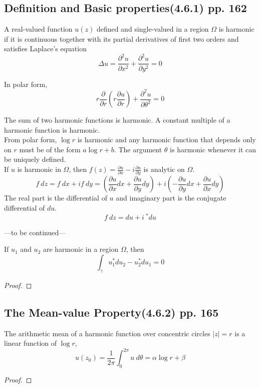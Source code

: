 \subsection{Definition and Basic properties(4.6.1) pp. 162}
\begin{definition}[harmonic]
	A real-valued function $u(z)$ defined and single-valued in a region $\Omega$ is harmonic if it is continuous together with its partial derivatives of first two orders and satisfies Laplace's equation
	\[ \Delta u = \frac{\partial^2 u}{\partial x^2} + \frac{\partial^2 u}{\partial y^2} = 0 \]

	In polar form,
	\[ r \frac{\partial}{\partial r} \left( r \frac{\partial u}{\partial r}\right) + \frac{\partial^2 u}{\partial \theta^2} = 0 \]
\end{definition}
\begin{remark}
	The sum of two harmonic functions is harmonic. A constant multiple of a harmonic function is harmonic.\\

	From polar form, $\log r$ is harmonic and any harmonic function that depends only on $r$ must be of the form $a \log r + b$.  The argument $\theta$ is harmonic whenever it can be uniquely defined. \\

	If $u$ is harmonic in $\Omega$, then $f(z) = \frac{\partial u}{\partial x} - i \frac{\partial u}{\partial y}$ is analytic on $\Omega$.\\

	\[ f\ dz = f\ dx+i f\ dy = \left( \frac{\partial u}{\partial x} dx + \frac{\partial u}{\partial y}dy \right) + i \left( -\frac{\partial u}{\partial y}dx + \frac{\partial u}{\partial x}dy \right) \]
	The real part is the differential of $u$ and imaginary part is the conjugate differential of $du$.
	\[ f\ dz = du + i\ \underset{}{^\ast}du \]
\end{remark}

---to be continued---

\begin{theorem}
	If $u_1$ and $u_2$ are harmonic in a region $\Omega$, then
	\[ \int_\gamma u_1 ^\ast du_2 - u_2 ^\ast du_1 = 0 \]
\end{theorem}
\begin{proof}
\end{proof}

\subsection{The Mean-value Property(4.6.2) pp. 165}
\begin{theorem}
	The arithmetic mean of a harmonic function over concentric circles $|z|=r$ is a linear function of $\log r$,	
	\begin{equation}
		u(z_0) = \frac{1}{2\pi} \int_0^{2\pi} u\ d\theta = \alpha \log r + \beta
	\end{equation}
\end{theorem}
\begin{proof}
\end{proof}

